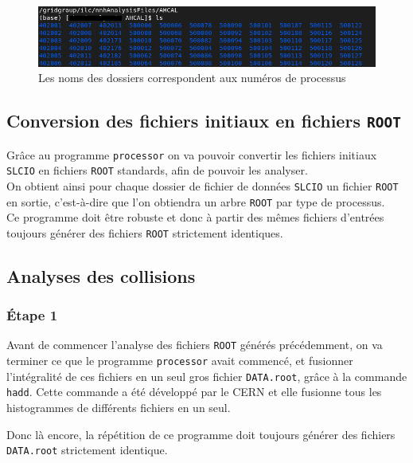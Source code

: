 \documentclass[10pt,a4paper]{report}
\newcommand{\cad}{c'est-à-dire\xspace}
\newcommand{\ROOT}{\texttt{ROOT}\xspace}
\newcommand{\SLCIO}{\texttt{SLCIO}\xspace}
\newcommand{\processor}{\texttt{processor}\xspace}
\begin{document}
\begin{figure}[h!]
	\includegraphics[width=\textwidth]{../img/listeProcessus.png} 
	\caption{Les noms des dossiers correspondent aux numéros de processus}
	\label{data:list}
\end{figure}



\subsection{Conversion des fichiers initiaux en fichiers \ROOT}

Grâce au programme \processor on va pouvoir convertir les fichiers initiaux \SLCIO en fichiers \ROOT standards, afin de pouvoir les analyser.\\

On obtient ainsi pour chaque dossier de fichier de données \SLCIO un fichier \ROOT en sortie, \cad que l'on obtiendra un arbre \ROOT par type de processus.\\

Ce programme doit être robuste et donc à partir des mêmes fichiers d'entrées toujours générer des fichiers \ROOT strictement identiques.

\subsection{Analyses des collisions}

\subsubsection{Étape 1}

Avant de commencer l'analyse des fichiers \ROOT générés précédemment, on va terminer ce que le programme \processor avait commencé, et fusionner l'intégralité de ces fichiers en un seul gros fichier \texttt{DATA.root}, grâce à la commande \texttt{hadd}. 
Cette commande a été développé par le CERN et elle fusionne tous les histogrammes de différents fichiers en un seul. 

Donc là encore, la répétition de ce programme doit toujours générer des fichiers \texttt{DATA.root} strictement identique.
\end{document}
